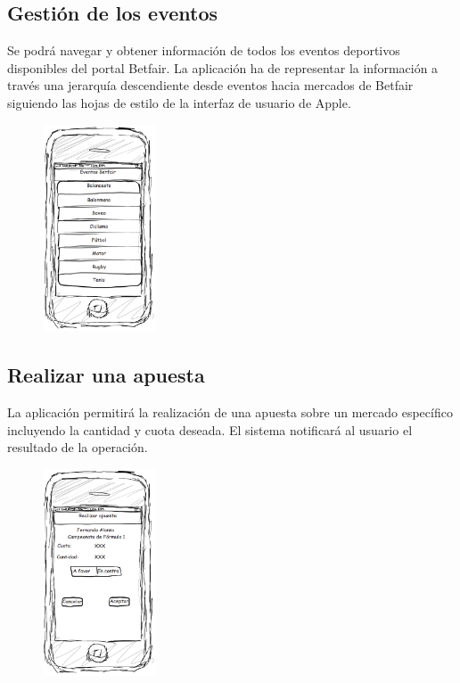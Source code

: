 \subsection{Gestión de los eventos}
Se podrá navegar y obtener información de todos los eventos deportivos disponibles del portal Betfair. La aplicación ha de representar la información a través una jerarquía descendiente desde eventos hacia mercados de Betfair siguiendo las hojas de estilo de la interfaz de usuario de Apple.
\begin{figure}[H]
    \centering
       \includegraphics[width=0.3\textwidth]{./images/req_eventos.png}
   \label{fig:Requisito eventos}
\end{figure}
\subsection{Realizar una apuesta}
La aplicación permitirá la realización de una apuesta sobre un mercado específico incluyendo la cantidad y cuota deseada. El sistema notificará al usuario el resultado de la operación.
\begin{figure}[H]
    \centering
       \includegraphics[width=0.3\textwidth]{./images/req_apuestas.png}
   \label{fig:Requisito realizar una apuesta}
\end{figure}
